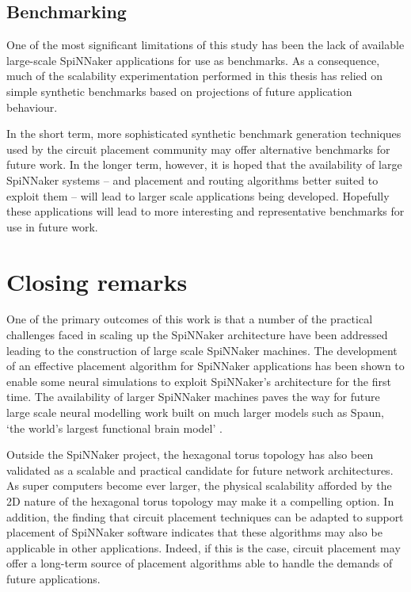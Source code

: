 		\subsection{Benchmarking}
			
			One of the most significant limitations of this study has been the lack
			of available large-scale SpiNNaker applications for use as benchmarks. As
			a consequence, much of the scalability experimentation performed in this
			thesis has relied on simple synthetic benchmarks based on projections of
			future application behaviour.
			
			In the short term, more sophisticated synthetic benchmark generation
			techniques used by the circuit placement community \cite{nam07} may offer
			alternative benchmarks for future work. In the longer term, however, it
			is hoped that the availability of large SpiNNaker systems -- and
			placement and routing algorithms better suited to exploit them -- will
			lead to larger scale applications being developed. Hopefully these
			applications will lead to more interesting and representative benchmarks
			for use in future work.
	
	\section{Closing remarks}
		
		One of the primary outcomes of this work is that a number of the practical
		challenges faced in scaling up the SpiNNaker architecture have been
		addressed leading to the construction of large scale SpiNNaker machines.
		The development of an effective placement algorithm for SpiNNaker
		applications has been shown to enable some neural simulations to exploit
		SpiNNaker's architecture for the first time. The availability of larger
		SpiNNaker machines paves the way for future large scale neural modelling
		work built on much larger models such as Spaun, `the world's largest
		functional brain model' \cite{eliasmith12}.
		
		Outside the SpiNNaker project, the hexagonal torus topology has also been
		validated as a scalable and practical candidate for future network
		architectures. As super computers become ever larger, the physical
		scalability afforded by the 2D nature of the hexagonal torus topology may
		make it a compelling option. In addition, the finding that circuit
		placement techniques can be adapted to support placement of SpiNNaker
		software indicates that these algorithms may also be applicable in other
		applications. Indeed, if this is the case, circuit placement may offer a
		long-term source of placement algorithms able to handle the demands of
		future applications.
		
